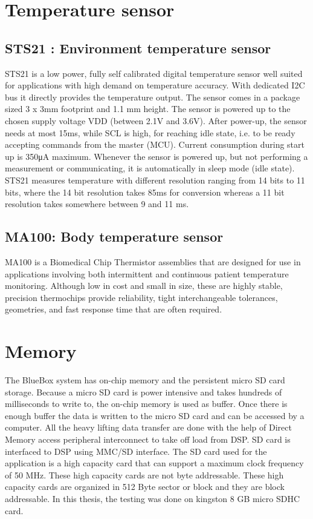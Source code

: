 \section{Temperature sensor}
\subsection{ STS21 : Environment temperature sensor}
STS21 is a low power, fully self calibrated digital temperature sensor well suited for applications with high demand on temperature accuracy. With dedicated I2C bus it directly provides the temperature output. The sensor comes in a package sized 3 x 3mm footprint and 1.1 mm height. The sensor is powered up to the chosen supply voltage VDD (between 2.1V and 3.6V). After power-up, the sensor needs at most 15ms, while SCL is high, for reaching idle state, i.e. to be ready accepting commands from the master (MCU). Current consumption during start up is 350μA maximum. Whenever the sensor is powered up, but not performing a measurement or communicating, it is automatically in sleep mode (idle state). STS21 measures temperature with different resolution ranging from 14 bits to 11 bits, where the 14 bit resolution takes 85ms for conversion whereas a 11 bit resolution takes somewhere between 9 and 11 ms.  

\subsection{MA100: Body temperature sensor} 
MA100 is a Biomedical Chip Thermistor assemblies that are designed for use in applications involving both intermittent and continuous patient temperature monitoring. Although low in cost and small in size, these are highly stable, precision thermochips provide reliability, tight interchangeable tolerances, geometries, and fast response time that are often required. 
\section{Memory}
The BlueBox system has on-chip memory and the persistent micro SD card storage. Because a micro SD card is power intensive and takes hundreds of milliseconds to write to, the on-chip memory is used as buffer. Once there is enough buffer the data is written to the micro SD card and can be accessed by a computer. All the heavy lifting data transfer are done with the help of Direct Memory access peripheral interconnect to take off load from DSP. SD card is interfaced to DSP using MMC/SD interface. The SD card used for the application is a high capacity card that can support a maximum clock frequency of 50 MHz. These high capacity cards are not byte addressable. These high capacity cards are organized in 512 Byte sector or block and they are block addressable. In this thesis, the testing was done on kingston 8 GB micro SDHC card. 


